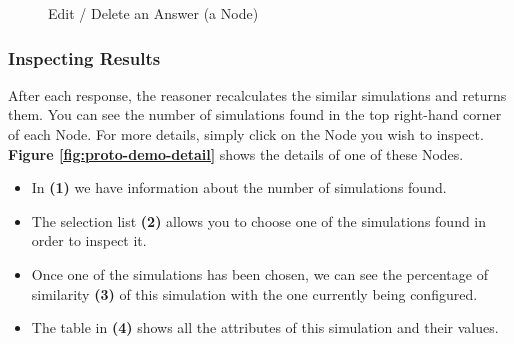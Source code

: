     \begin{figure}[h]
    \centering
    \caption{\label{fig:proto-demo-edit-delete-answer}  Edit / Delete an Answer (a Node)}
    \end{figure}

    
    \subsubsection{Inspecting Results}
    After each response, the reasoner recalculates the similar simulations and returns them. You can see the number of simulations found in the top right-hand corner of each Node. For more details, simply click on the Node you wish to inspect. \textbf{Figure \ref{fig:proto-demo-detail}} shows the details of one of these Nodes.
    
    \begin{itemize}
        \item In \textbf{(1)} we have information about the number of simulations found.
        \item The selection list \textbf{(2)} allows you to choose one of the simulations found in order to inspect it.
        \item Once one of the simulations has been chosen, we can see the percentage of similarity \textbf{(3)} of this simulation with the one currently being configured.
        \item The table in \textbf{(4)} shows all the attributes of this simulation and their values.
    \end{itemize}
    
